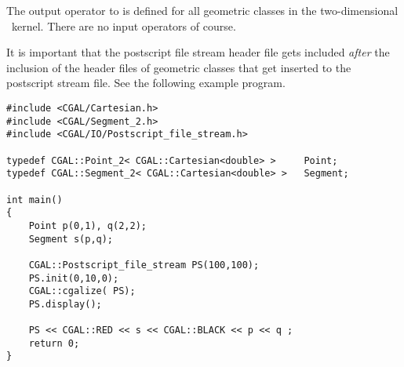 The output operator to  is defined for all geometric classes 
in the two-dimensional \cgal\ kernel. There are no input operators of course.

It is important that the postscript file stream header file gets included
{\em after} the inclusion of the header files of geometric classes
that get inserted to the postscript stream file. See the following example program.

\begin{verbatim}
#include <CGAL/Cartesian.h>
#include <CGAL/Segment_2.h>
#include <CGAL/IO/Postscript_file_stream.h>

typedef CGAL::Point_2< CGAL::Cartesian<double> >     Point;
typedef CGAL::Segment_2< CGAL::Cartesian<double> >   Segment;

int main()
{
    Point p(0,1), q(2,2);
    Segment s(p,q);

    CGAL::Postscript_file_stream PS(100,100);
    PS.init(0,10,0);
    CGAL::cgalize( PS);
    PS.display();

    PS << CGAL::RED << s << CGAL::BLACK << p << q ;
    return 0;
}
\end{verbatim} 

